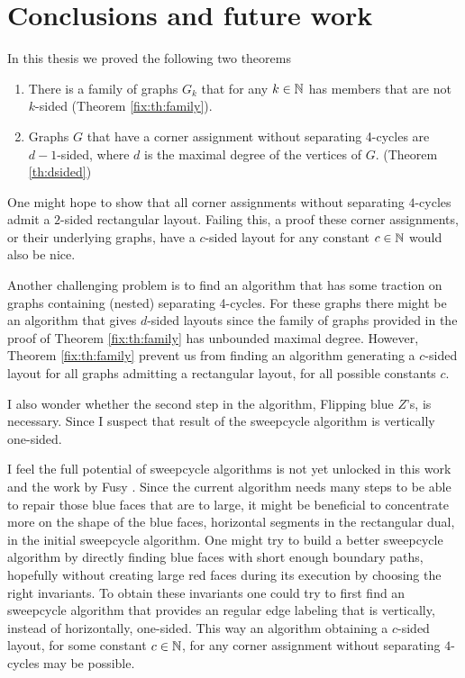 
\thispagestyle{plain}
\section{Conclusions and future work}

In this thesis we proved the following two theorems

\begin{enumerate}
  \item There is a family of graphs $G_k$ that for any $k \in \mathbb{N}$ has members that are not $k$-sided (Theorem \ref{fix:th:family}).
  \item Graphs $G$ that have a corner assignment without separating 4-cycles are $d-1$-sided, where $d$ is the maximal degree of the vertices of $G$. (Theorem \ref{th:dsided})
\end{enumerate}

One might hope to show that all corner assignments without separating $4$-cycles admit a $2$-sided rectangular layout. Failing this, a proof these corner assignments, or their underlying graphs, have a $c$-sided layout for any constant $c\in \mathbb{N}$ would also be nice.

Another challenging problem is to find an algorithm that has some traction on graphs containing (nested) separating 4-cycles.
For these graphs there might be an algorithm that gives $d$-sided layouts since the family of graphs provided in the proof of Theorem \ref{fix:th:family} has unbounded maximal degree.
However, Theorem \ref{fix:th:family} prevent us from finding an algorithm generating a $c$-sided layout for all graphs admitting a rectangular layout, for all possible constants $c$.

I also wonder whether the second step in the algorithm, Flipping blue $Z$'s, is necessary.
Since I suspect that result of the sweepcycle algorithm is vertically one-sided.

I feel the full potential of sweepcycle algorithms is not yet unlocked in this work and the work by Fusy \cite{Fusy2006}.
Since the current algorithm needs many steps to be able to repair those blue faces that are to large, it might be beneficial to concentrate more on the shape of the blue faces, horizontal segments in the rectangular dual, in the initial sweepcycle algorithm.
One might try to build a better sweepcycle algorithm by directly finding blue faces with short enough boundary paths, hopefully without creating large red faces during its execution by choosing the right invariants.
To obtain these invariants one could try to first find an sweepcycle algorithm that provides an regular edge labeling that is vertically, instead of horizontally, one-sided.
This way an algorithm obtaining a $c$-sided layout, for some constant $c \in \mathbb{N}$, for any corner assignment without separating $4$-cycles may be possible.

